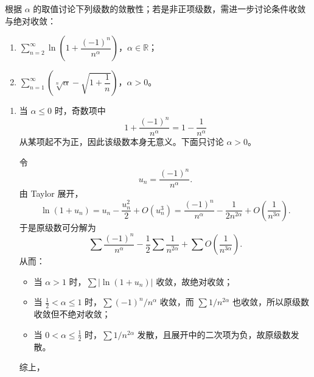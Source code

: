 \begin{question}[含参数级数的敛散性]

根据 $\alpha$ 的取值讨论下列级数的敛散性；若是非正项级数，需进一步讨论条件收敛与绝对收敛：
\begin{enumerate}[label=(\arabic*),leftmargin=2.6em,itemsep=0.25em,topsep=0.2em]
\item $\sum_{n=2}^{\infty}\ln\!\left(1+\dfrac{(-1)^n}{n^\alpha}\right)$，$\alpha\in\mathbb R$；
\item $\sum_{n=1}^{\infty}\left(\sqrt[n]{\alpha}-\sqrt{1+\dfrac{1}{n}}\right)$，$\alpha>0$。
\end{enumerate}

\begin{solution}
\begin{enumerate}[label=(\arabic*),leftmargin=2.6em,itemsep=0.25em,topsep=0.2em]
\item 当 $\alpha\le0$ 时，奇数项中
\[
1+\frac{(-1)^n}{n^\alpha}=1-\frac{1}{n^\alpha}
\]
从某项起不为正，因此该级数本身无意义。下面只讨论 $\alpha>0$。

令
\[
u_n=\frac{(-1)^n}{n^\alpha}.
\]
由 Taylor 展开，
\[
\ln(1+u_n)=u_n-\frac{u_n^2}{2}+O(u_n^3)
=\frac{(-1)^n}{n^\alpha}-\frac{1}{2n^{2\alpha}}+O\!\left(\frac{1}{n^{3\alpha}}\right).
\]
于是原级数可分解为
\[
\sum \frac{(-1)^n}{n^\alpha}-\frac12\sum \frac{1}{n^{2\alpha}}
+\sum O\!\left(\frac{1}{n^{3\alpha}}\right).
\]
从而：
\begin{itemize}[leftmargin=2em,itemsep=0.2em,topsep=0.2em]
\item 当 $\alpha>1$ 时，$\sum |\ln(1+u_n)|$ 收敛，故绝对收敛；
\item 当 $\frac12<\alpha\le1$ 时，$\sum (-1)^n/n^\alpha$ 收敛，而 $\sum 1/n^{2\alpha}$ 也收敛，所以原级数收敛但不绝对收敛；
\item 当 $0<\alpha\le\frac12$ 时，$\sum 1/n^{2\alpha}$ 发散，且展开中的二次项为负，故原级数发散。
\end{itemize}
综上，


\end{enumerate}
\end{solution}
\end{question}
